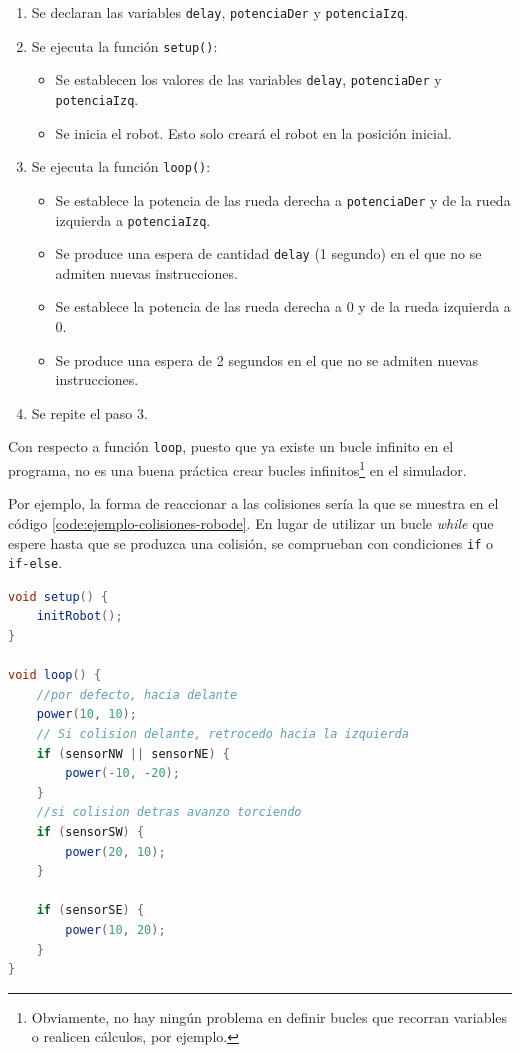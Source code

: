\begin{enumerate}
	\item Se declaran las variables \texttt{delay}, \texttt{potenciaDer} y \texttt{potenciaIzq}. 
	\item Se ejecuta la función \texttt{setup()}:
\begin{itemize}
	\item Se establecen los valores de las variables \texttt{delay}, \texttt{potenciaDer} y \texttt{potenciaIzq}. 
	\item Se inicia el robot. Esto solo creará el robot en la posición inicial. 
\end{itemize}
	\item Se ejecuta la función \texttt{loop()}:
\begin{itemize}
	\item Se establece la potencia de las rueda derecha a \texttt{potenciaDer} y de la rueda izquierda a \texttt{potenciaIzq}.
	\item Se produce una espera de cantidad \texttt{delay} (1 segundo) en el que no se admiten nuevas instrucciones.
	\item Se establece la potencia de las rueda derecha a 0 y de la rueda izquierda a 0.
	\item Se produce una espera de 2 segundos en el que no se admiten nuevas instrucciones.
\end{itemize}
	\item Se repite el paso 3.
\end{enumerate}

Con respecto a función \texttt{loop}, puesto que ya existe un bucle infinito en el programa, no es una buena práctica crear bucles infinitos\footnote{Obviamente, no hay ningún problema en definir bucles que recorran variables o realicen cálculos, por ejemplo.} en el simulador.

Por ejemplo, la forma de reaccionar a las colisiones sería la que se muestra en el código \ref{code:ejemplo-colisiones-robode}. En lugar de utilizar un bucle \emph{while} que espere hasta que se produzca una colisión, se comprueban con condiciones \texttt{if} o \texttt{if-else}.

\begin{lstlisting}[language={Java},label={code:ejemplo-colisiones-robode}, caption={Ejemplo de buenas prácticas en el uso de la API del simulador.}]
void setup() {
    initRobot();
}

void loop() {
	//por defecto, hacia delante
    power(10, 10);
	// Si colision delante, retrocedo hacia la izquierda
    if (sensorNW || sensorNE) {
        power(-10, -20);
    }
  	//si colision detras avanzo torciendo
    if (sensorSW) {
        power(20, 10);
    }
    
    if (sensorSE) {
        power(10, 20);
    }
}
\end{lstlisting}

